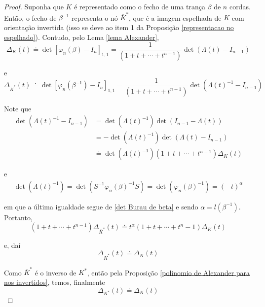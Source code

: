 	\begin{proof}
		Suponha que $K$ é representado como o fecho de uma trança $\beta$ de $n$ cordas. Então, o fecho de $\beta^{-1}$ representa o nó $\overline{K}^{\ast}$, que é a imagem espelhada de $K$ com orientação invertida (isso se deve ao item 1 da Proposição \eqref{representacao no espelhado}). Contudo, pelo Lema \eqref{lema Alexander},
		\begin{equation*}
		\Delta_K(t) \doteq \det[\varphi_n(\beta) - I_n]_{1,1} = \frac{1}{(1+t+\cdots+t^{n-1})}\det(\Lambda(t) - I_{n-1})
		\end{equation*}
		\par\vspace{0.3cm} e
		\begin{equation*}
		\Delta_{\overline{K}^{\ast}}(t) \doteq \det[\varphi_n(\beta^{-1}) - I_n]_{1,1} = \frac{1}{(1+t+\cdots+t^{n-1})}\det(\Lambda(t)^{-1} - I_{n-1})
		\end{equation*}
		\par\vspace{0.3cm} Note que
		\begin{align*}
		\det(\Lambda(t)^{-1} - I_{n-1}) &= \det(\Lambda(t)^{-1})\det(I_{n-1} - \Lambda(t)) \\
		&= -\det(\Lambda(t)^{-1})\det(\Lambda(t) - I_{n-1}) \\
		&\doteq \det(\Lambda(t)^{-1})(1+t+\cdots+t^{n-1})\Delta_K(t) 
		\end{align*}
		\par\vspace{0.3cm} e
		\begin{align*}
		\det(\Lambda(t)^{-1}) = \det( S^{-1}\varphi_n(\beta)^{-1}S ) = \det(\varphi_n(\beta)^{-1}) = (-t)^{\alpha}
		\end{align*}
		\par\vspace{0.3cm} em que a última igualdade segue de \eqref{det Burau de beta} e sendo $\alpha = l(\beta^{-1})$. Portanto, 
		\begin{equation*}
		(1+t+\cdots+t^{n-1})\Delta_{\overline{K}^{\ast}}(t)\doteq t^{\alpha}(1+t+\cdots+t^n-1)\Delta_K(t)
		\end{equation*}
		\par\vspace{0.3cm} e, daí
		\begin{equation*}
		\Delta_{\overline{K}^{\ast}}(t) \doteq \Delta_K(t)
		\end{equation*}
		\par\vspace{0.3cm} Como $\overline{K}^{\ast}$ é o inverso de $K^\ast$, então pela Proposição \eqref{polinomio de Alexander para nos invertidos}, temos, finalmente
		\begin{equation*}
		\Delta_{K^\ast}(t) \doteq \Delta_K(t)
		\end{equation*}
	\end{proof}

